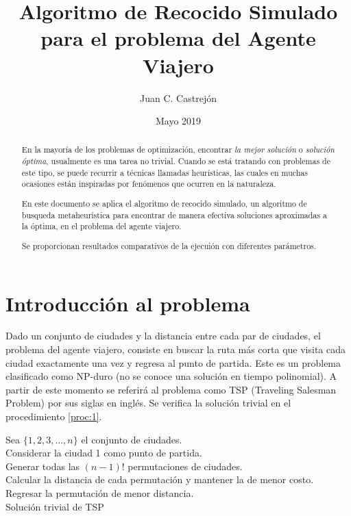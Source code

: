 \documentclass[12pt, letterpaper]{article}
\title{Algoritmo de Recocido Simulado para el problema del Agente Viajero}
\author{Juan C. Castrejón}
\date{Mayo 2019}
\begin{document}
\maketitle
\newcommand{\R}{\mathbb{R}}
\renewcommand{\abstractname}{Resumen}
\renewcommand{\algorithmcfname}{Procedimiento}
\renewcommand{\refname}{Referencias}
\renewcommand{\figurename}{Figura}

\begin{abstract}
En la mayoría de los problemas de optimización, encontrar \textit{la mejor solución} o \textit{solución óptima}, usualmente es una tarea no trivial. Cuando se está tratando con problemas de este tipo, se puede recurrir a técnicas llamadas heurísticas, las cuales en muchas ocasiones están inspiradas por fenómenos que ocurren en la naturaleza.
\par
En este documento se aplica el algoritmo de recocido simulado, un algoritmo de busqueda metaheurística para encontrar de manera efectiva soluciones aproximadas a la óptima, en el problema del agente viajero.
\par
Se proporcionan resultados comparativos de la ejecuión con diferentes parámetros.
\end{abstract}


\section{Introducción al problema}

Dado un conjunto de ciudades y la distancia entre cada par de ciudades, el problema del agente viajero, consiste en buscar la ruta más corta que visita cada ciudad exactamente una vez y regresa al punto de partida. Este es un problema clasificado como NP-duro (no se conoce una solución en tiempo polinomial). A partir de este momento se referirá al problema como TSP (Traveling Salesman Problem) por sus siglas en inglés. Se verifica la solución trivial en el procedimiento \ref{proc:1}.

\LinesNumbered
\begin{algorithm}[H]
Sea $\{1, 2, 3, ..., n\}$ el conjunto de ciudades.\\
Considerar la ciudad 1 como punto de partida.\\
Generar todas las $(n - 1)!$ permutaciones de ciudades.\\
Calcular la distancia de cada permutación y mantener la de menor costo.\\
Regresar la permutación de menor distancia.\\
\caption{Solución trivial de TSP}
\label{proc:1}
\end{algorithm}
\LinesNotNumbered
\bigskip
\end{document}
